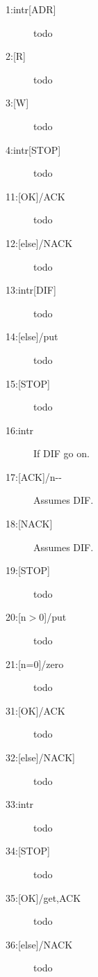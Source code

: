 \documentclass{article}
\begin{document}
\begin{description}
\item[{1:intr[ADR]}]
todo

\item[{2:[R]}]
todo

\item[{3:[W]}]
todo

\item[{4:intr[STOP]}]
todo

\item[{11:[OK]/ACK}]
todo

\item[{12:[else]/NACK}]
todo

\item[{13:intr[DIF]}]
todo

\item[{14:[else]/put}]
todo

\item[{15:[STOP]}]
todo

\item[{16:intr}]
If DIF go on.

\item[{17:[ACK]/n-{}-}]
Assumes DIF.

\item[{18:[NACK]}]
Assumes DIF.

\item[{19:[STOP]}]
todo

\item[{20:[n$>$0]/put}]
todo

\item[{21:[n=0]/zero}]
todo

\item[{31:[OK]/ACK}]
todo

\item[{32:[else]/NACK]}]
todo

\item[{33:intr}]
todo

\item[{34:[STOP]}]
todo

\item[{35:[OK]/get,ACK}]
todo

\item[{36:[else]/NACK}]
todo

\end{description}

\fi
\end{document}
